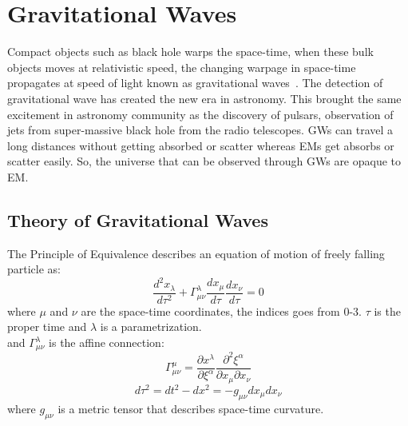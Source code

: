 \documentclass{ttuthes2007}
\begin{document}
\chapter{Gravitational Waves}
Compact objects such as black hole warps the space-time, when these bulk objects
moves at relativistic speed, the changing warpage in space-time propagates at
speed of light known as gravitational waves~\cite{thorne1995gravitational}. The
detection of gravitational wave has created the new era in astronomy. This
brought the same excitement in astronomy community as the discovery of pulsars,
observation of jets from super-massive black hole from the radio telescopes.
\acp{GW} can travel a long distances without getting absorbed or scatter whereas
\acp{EM} get absorbs or scatter easily. So, the universe that can be observed
through \acp{GW} are opaque to \ac{EM}. 

\section{Theory of Gravitational Waves}
The Principle of Equivalence describes an equation of motion of freely
falling particle as:
\begin{equation}
\frac{d^2x_\lambda}{d\tau^2}+\Gamma^\lambda_{\mu\nu}\frac{dx_\mu}{d\tau}\frac{dx_\nu}{d\tau}=0
\end{equation}
where $\mu$ and $\nu$ are the space-time coordinates, the indices goes from 0-3.
$\tau$ is the proper time and $\lambda$ is a parametrization.\\
and $\Gamma^\lambda_{\mu\nu}$ is the affine connection:
\begin{equation}
\Gamma^\mu_{\mu\nu} =\frac{\partial x^\lambda}{\partial
\xi^\alpha}\frac{\partial^2\xi^\alpha}{\partial x_\mu \partial x_\nu}
\end{equation}
\begin{equation}
d\tau^2=dt^2 - dx^2 = -g_{\mu\nu}dx_\mu dx_\nu
\end{equation}
where $g_{\mu\nu}$ is a metric tensor that describes space-time curvature.
\end{document}
